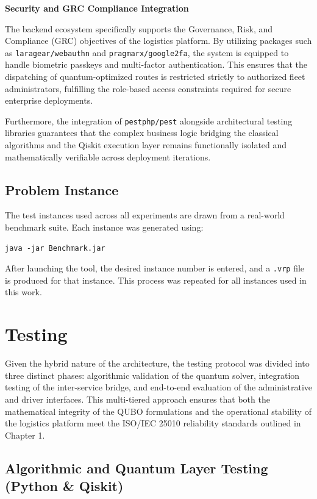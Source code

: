 \documentclass[a4paper]{report}
\begin{document}
{\begin{itemize}
\begin{itemize}
\vspace{1em}
\noindent\textbf{Security and GRC Compliance Integration}

The backend ecosystem specifically supports the Governance, Risk, and Compliance (GRC) objectives of the logistics platform. By utilizing packages such as \texttt{laragear/webauthn} and \texttt{pragmarx/google2fa}, the system is equipped to handle biometric passkeys and multi-factor authentication. This ensures that the dispatching of quantum-optimized routes is restricted strictly to authorized fleet administrators, fulfilling the role-based access constraints required for secure enterprise deployments.

Furthermore, the integration of \texttt{pestphp/pest} alongside architectural testing libraries guarantees that the complex business logic bridging the classical algorithms and the Qiskit execution layer remains functionally isolated and mathematically verifiable across deployment iterations.

\subsection{Problem Instance}

The test instances used across all experiments are drawn from a real-world
benchmark suite. Each instance was generated using:

\begin{verbatim}
java -jar Benchmark.jar
\end{verbatim}



After launching the tool, the desired instance number is entered,
and a \texttt{.vrp} file is produced for that instance. This process was
repeated for all instances used in this work.


\section{Testing }
Given the hybrid nature of the architecture, the testing protocol was divided into three distinct phases: algorithmic validation of the quantum solver, integration testing of the inter-service bridge, and end-to-end evaluation of the administrative and driver interfaces. This multi-tiered approach ensures that both the mathematical integrity of the QUBO formulations and the operational stability of the logistics platform meet the ISO/IEC 25010 reliability standards outlined in Chapter 1.

\subsection{Algorithmic and Quantum Layer Testing (Python \& Qiskit)}


\end{itemize}
\end{itemize}}
\end{document}

